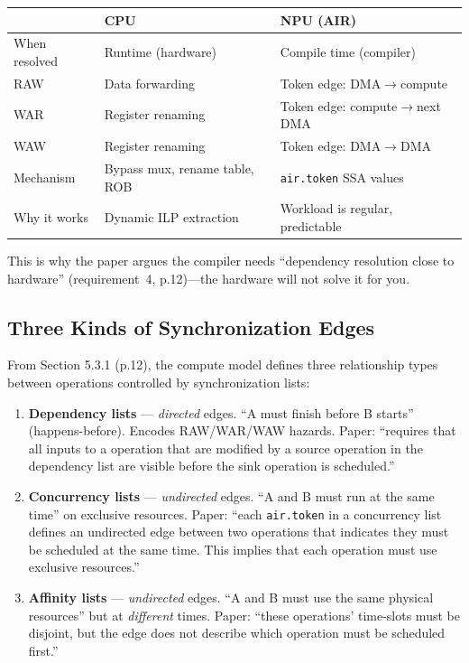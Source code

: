 \documentclass[11pt,a4paper]{article}
\begin{document}
\begin{center}
\small
\begin{tabular}{lll}
\toprule
& \textbf{CPU} & \textbf{NPU (AIR)} \\
\midrule
When resolved & Runtime (hardware) & Compile time (compiler) \\
RAW & Data forwarding & Token edge: DMA$\rightarrow$compute \\
WAR & Register renaming & Token edge: compute$\rightarrow$next DMA \\
WAW & Register renaming & Token edge: DMA$\rightarrow$DMA \\
Mechanism & Bypass mux, rename table, ROB & \texttt{air.token} SSA values \\
Why it works & Dynamic ILP extraction & Workload is regular, predictable \\
\bottomrule
\end{tabular}
\end{center}

This is why the paper argues the compiler needs ``dependency resolution close to
hardware'' (requirement~4, p.12)---the hardware will not solve it for you.

\subsection{Three Kinds of Synchronization Edges}

From Section 5.3.1 (p.12), the compute model defines three relationship types
between operations controlled by synchronization lists:

\begin{enumerate}[leftmargin=2em]
  \item \textbf{Dependency lists} --- \emph{directed} edges. ``A must finish before B
    starts'' (happens-before). Encodes RAW/WAR/WAW hazards. Paper: ``requires
    that all inputs to a operation that are modified by a source operation in the
    dependency list are visible before the sink operation is scheduled.''
  \item \textbf{Concurrency lists} --- \emph{undirected} edges. ``A and B must run at
    the same time'' on exclusive resources. Paper: ``each \texttt{air.token}
    in a concurrency list defines an undirected edge between two operations that
    indicates they must be scheduled at the same time. This implies that each
    operation must use exclusive resources.''
  \item \textbf{Affinity lists} --- \emph{undirected} edges. ``A and B must use the same
    physical resources'' but at \emph{different} times. Paper: ``these operations'
    time-slots must be disjoint, but the edge does not describe which operation
    must be scheduled first.''
\end{enumerate}
\end{document}
